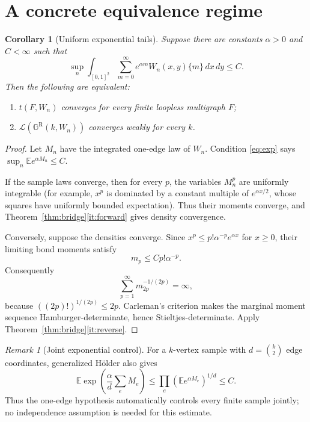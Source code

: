 \documentclass[11pt]{article}
\newtheorem{corollary}[theorem]{Corollary}
\theoremstyle{remark}
\newtheorem{remark}[theorem]{Remark}
\newcommand{\Ee}{\mathbb E}
\newcommand{\Law}{\mathcal L}
\newcommand{\Gsample}{\mathbb G^{\mathrm R}}
\begin{document}
\section{A concrete equivalence regime}

\begin{corollary}[Uniform exponential tails]\label{cor:exp}
Suppose there are constants $\alpha>0$ and $C<\infty$ such that
\begin{equation}\label{eq:exp}
 \sup_n\int_{[0,1]^2}
 \sum_{m=0}^{\infty}e^{\alpha m}
 W_n(x,y)\{m\}\,dx\,dy\leq C.
\end{equation}
Then the following are equivalent:
\begin{enumerate}[label=\textup{(\alph*)},leftmargin=2em]
\item $t(F,W_n)$ converges for every finite loopless multigraph $F$;
\item $\Law(\Gsample(k,W_n))$ converges weakly for every $k$.
\end{enumerate}
\end{corollary}

\begin{proof}
Let $M_n$ have the integrated one-edge law of $W_n$.  Condition
\eqref{eq:exp} says $\sup_n\Ee e^{\alpha M_n}\leq C$.

If the sample laws converge, then for every $p$, the variables $M_n^p$ are
uniformly integrable (for example, $x^p$ is dominated by a constant multiple
of $e^{\alpha x/2}$, whose squares have uniformly bounded expectation).
Thus their moments converge, and
Theorem~\ref{thm:bridge}\ref{it:forward} gives density convergence.

Conversely, suppose the densities converge.  Since
$x^p\leq p!\alpha^{-p}e^{\alpha x}$ for $x\geq0$, their limiting bond moments
satisfy
\begin{equation}\label{eq:factorial}
 m_p\leq C p!\alpha^{-p}.
\end{equation}
Consequently
\[
 \sum_{p=1}^{\infty}m_{2p}^{-1/(2p)}=\infty,
\]
because $((2p)!)^{1/(2p)}\leq 2p$.  Carleman's criterion makes the marginal
moment sequence Hamburger-determinate, hence Stieltjes-determinate.  Apply
Theorem~\ref{thm:bridge}\ref{it:reverse}.
\end{proof}

\begin{remark}[Joint exponential control]
For a $k$-vertex sample with $d=\binom{k}{2}$ edge coordinates, generalized
H\"older also gives
\[
 \Ee\exp\!\left(\frac{\alpha}{d}\sum_e M_e\right)
 \leq\prod_e\left(\Ee e^{\alpha M_e}\right)^{1/d}
 \leq C.
\]
Thus the one-edge hypothesis automatically controls every finite sample
jointly; no independence assumption is needed for this estimate.
\end{remark}
\end{document}
